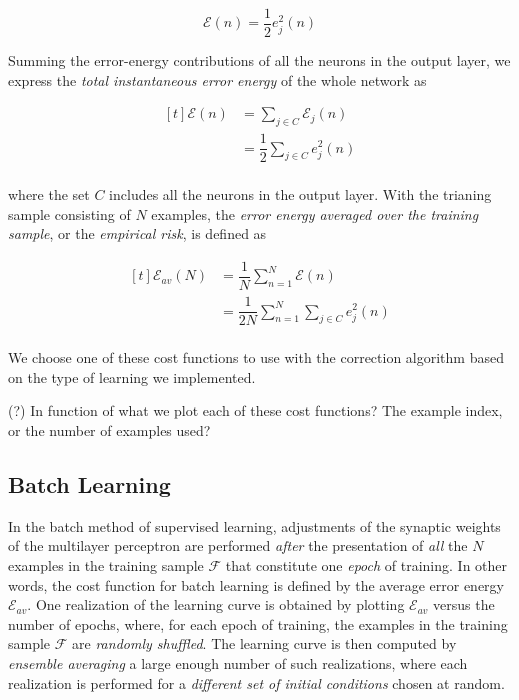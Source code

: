 \documentclass[twocolumn]{article}
\begin{document}
	$$ \mathcal{E} (n) = \dfrac{1}{2} e_{j}^{2} (n) $$

	Summing the error-energy contributions of all the neurons in the output layer, we express the \textit{total instantaneous error energy} of the whole network as

	$$ \begin{aligned}[t]
			\mathcal{E} (n) & = \sum_{j \in C} \mathcal{E}_{j} (n)        \\
			                & = \dfrac{1}{2} \sum_{j \in C} e_{j}^{2} (n) \\
		\end{aligned} $$

	\noindent where the set $ C $ includes all the neurons in the output layer. With the trianing sample consisting of $ N $ examples, the \textit{error energy averaged over the training sample}, or the \textit{empirical risk}, is defined as

	$$ \begin{aligned}[t]
			\mathcal{E}_{av} (N) & = \dfrac{1}{N} \sum_{n = 1}^{N} \mathcal{E} (n)               \\
			                     & = \dfrac{1}{2N} \sum_{n = 1}^{N} \sum_{j \in C} e_{j}^{2} (n) \\
		\end{aligned} $$

	We choose one of these cost functions to use with the correction algorithm based on the type of learning we implemented.

	\noindent (?) In function of what we plot each of these cost functions? The example index, or the number of examples used?

	\subsection{Batch Learning}

		In the batch method of supervised learning, adjustments of the synaptic weights of the multilayer perceptron are performed \textit{after} the presentation of \textit{all} the $ N $ examples in the training sample $ \mathcal{F} $ that constitute one \textit{epoch} of training. In other words, the cost function for batch learning is defined by the average error energy $ \mathcal{E}_{av} $. One realization of the learning curve is obtained by plotting $ \mathcal{E}_{av} $ versus the number of epochs, where, for each epoch of training, the examples in the training sample $ \mathcal{F} $ are \textit{randomly shuffled}. The learning curve is then computed by \textit{ensemble averaging} a large enough number of such realizations, where each realization is performed for a \textit{different set of initial conditions} chosen at random.
\end{document}
